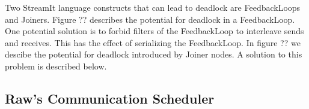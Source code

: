 Two StreamIt language constructs that can lead to deadlock are
FeedbackLoops and Joiners. Figure ?? describes the potential for
deadlock in a FeedbackLoop.  One potential solution is to forbid
filters of the FeedbackLoop to interleave sends and receives.  This
has the effect of serializing the FeedbackLoop. In figure ?? we
descibe the potential for deadlock introduced by Joiner nodes.  A
solution to this problem is described below.

\subsection{Raw's Communication Scheduler}

